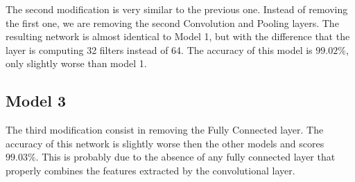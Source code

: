 The second modification is very similar to the previous one. Instead of removing the first one, we are removing the second Convolution and Pooling layers.
The resulting network is almost identical to Model 1, but with the difference that the layer is computing 32 filters instead of 64.
The accuracy of this model is $99.02\%$, only slightly worse than model 1.


\subsection{Model 3}

The third modification consist in removing the Fully Connected layer.
The accuracy of this network is slightly worse then the other models and scores $99.03\%$.
This is probably due to the absence of any fully connected layer that properly combines the features extracted by the convolutional layer.
